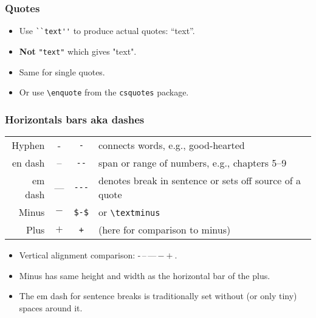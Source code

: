 \documentclass[aspectratio=1610,hyperref={colorlinks,linkcolor=}]{beamer}
\begin{document}
\begin{frame}[fragile]
    \frametitle{Quotes}
    \begin{itemize}
        \item Use \verb+``text''+ to produce actual quotes: ``text''.
        \item \textbf{Not} \verb+"text"+ which gives "text". %
        \item Same for single quotes.
        \item Or use \verb+\enquote+ from the \texttt{csquotes} package.
    \end{itemize}
\end{frame}

\begin{frame}[fragile]
    \frametitle{Horizontals bars aka dashes}
    \begin{tabular}{rccl}
        Hyphen & - & \verb+-+ & connects words, e.g., good-hearted \\ %
        en dash & -- & \verb+--+ & span or range of numbers, e.g., chapters 5--9 \\ %
        em dash & --- & \verb+---+ & denotes break in sentence or sets off source of a quote \\
        Minus & $-$ & \verb+$-$+ & or \verb+\textminus+ \\
        Plus & $+$ & \verb$+$ & (here for comparison to minus)  \\
    \end{tabular}
    \begin{itemize}
        \item Vertical alignment comparison: {\Huge -\,--\,---\,$-+$}. %
        \item Minus has same height and width as the horizontal bar of the plus.
        \item The em dash for sentence breaks is traditionally set without (or only tiny) spaces around it.
    \end{itemize}
\end{frame}
\end{document}
